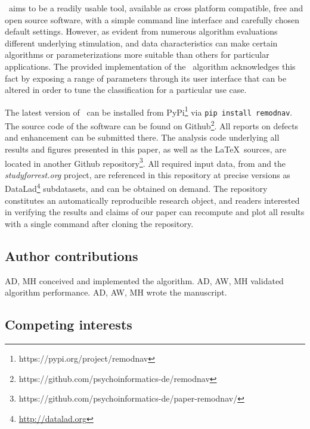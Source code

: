 \remodnav\ aims to be a readily usable tool, available as cross platform
compatible, free and open source software, with a simple command line interface
and carefully chosen default settings. However, as evident from numerous
algorithm evaluations
\citep[\eg][]{Andersson2017,Larsson2013,Zemblys2018,5523936} different
underlying stimulation, and data characteristics can make certain algorithms or
parameterizations more suitable than others for particular applications. The
provided implementation of the \remodnav\ algorithm \citep{michael_hanke_2019_2651042}
acknowledges this fact by
exposing a range of parameters through its user interface that can be altered
in order to tune the classification for a particular use case.

The latest version of \remodnav\ can be installed from
PyPi\footnote{https://pypi.org/project/remodnav} via \texttt{pip install
remodnav}. The source code of the software can be found on
Github\footnote{https://github.com/psychoinformatics-de/remodnav}. All reports
on defects and enhancement can be submitted there.
%
The analysis code underlying all results and figures presented in this paper,
as well as the \LaTeX\ sources, are located in another Github
repository\footnote{https://github.com/psychoinformatics-de/paper-remodnav/}.
All required input data, from \cite{Andersson2017} and the
\textit{studyforrest.org} project, are referenced in this repository at precise
versions as DataLad\footnote{\url{http://datalad.org}} subdatasets, and can be
obtained on demand. The repository constitutes an automatically reproducible
research object, and readers interested in verifying the results and claims of
our paper can recompute and plot all results with a single command after cloning
the repository.

\subsection*{Author contributions}


AD, MH conceived and implemented the algorithm.
AD, AW, MH validated algorithm performance.
AD, AW, MH wrote the manuscript.

\subsection*{Competing interests}

